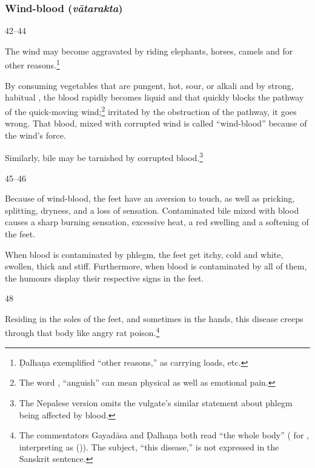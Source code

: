 \begin{translation}
\subsubsection{Wind-blood (\emph{vātarakta})}

\item[42--44]

The wind may become aggravated by riding elephants, horses, camels and
for other reasons.\footnote{Ḍalhaṇa exemplified “other reasons,” as
    carrying loads, etc.}

By consuming vegetables that are pungent, hot, sour, or alkali and by
strong, habitual , the blood rapidly becomes
liquid and that quickly blocks the pathway of the quick-moving
wind;\footnote{The word , “anguish” can mean physical as
    well as emotional pain.}  irritated by the obstruction of the pathway, it goes 
    wrong. 
%
That blood, mixed with corrupted wind is called 
“wind-blood” because of  the wind's force. 

Similarly, bile may be tarnished by corrupted blood.\footnote{The Nepalese version 
omits the vulgate's similar statement about phlegm being affected by blood.} 



	


\item[45--46]

	Because of wind-blood, the feet have an
    aversion to touch, as well as 
    pricking, splitting, dryness, and a loss of sensation. 
     Contaminated bile mixed with blood causes a sharp burning sensation,
	excessive heat, a red swelling and a softening of the feet.
    
        
When blood is contaminated by phlegm, the feet get itchy, cold and white, 
	swollen, thick and stiff.   
    	Furthermore, when blood is contaminated by all of them, the humours 
        display their respective signs in the feet.

\item[48]

	Residing in the soles of the feet, and sometimes in the hands, this disease 
	creeps through that body like angry rat poison.\footnote{The 
	commentators 
	Gayadāsa and Ḍalhaṇa both read “the whole body” ( for 
	, interpreting  as 
	(\cite[264]{vulgate})).  The subject, “this disease,” is not expressed in the 
	Sanskrit sentence.}



\end{translation}
